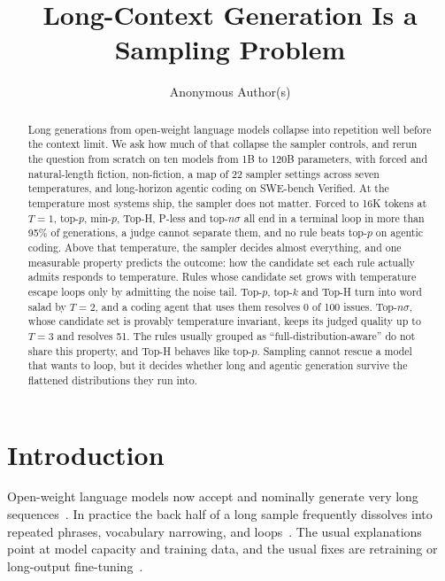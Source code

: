 \documentclass{article}
\title{Long-Context Generation Is a Sampling Problem}
\author{
  Anonymous Author(s)
}
\begin{document}
\maketitle


\begin{abstract}
Long generations from open-weight language models collapse into repetition well before the context limit. We ask how much of that collapse the sampler controls, and rerun the question from scratch on ten models from 1B to 120B parameters, with forced and natural-length fiction, non-fiction, a map of 22 sampler settings across seven temperatures, and long-horizon agentic coding on SWE-bench Verified. At the temperature most systems ship, the sampler does not matter. Forced to 16K tokens at $T{=}1$, top-$p$, min-$p$, Top-H, P-less and top-$n\sigma$ all end in a terminal loop in more than 95\% of generations, a judge cannot separate them, and no rule beats top-$p$ on agentic coding. Above that temperature, the sampler decides almost everything, and one measurable property predicts the outcome: how the candidate set each rule actually admits responds to temperature. Rules whose candidate set grows with temperature escape loops only by admitting the noise tail. Top-$p$, top-$k$ and Top-H turn into word salad by $T{=}2$, and a coding agent that uses them resolves 0 of 100 issues. Top-$n\sigma$, whose candidate set is provably temperature invariant, keeps its judged quality up to $T{=}3$ and resolves 51. The rules usually grouped as ``full-distribution-aware'' do not share this property, and Top-H behaves like top-$p$. Sampling cannot rescue a model that wants to loop, but it decides whether long and agentic generation survive the flattened distributions they run into.
\end{abstract}

\section{Introduction}

Open-weight language models now accept and nominally generate very long sequences~\citep{dubey2024llama3,yang2024qwen2}. In practice the back half of a long sample frequently dissolves into repeated phrases, vocabulary narrowing, and loops~\citep{holtzman2020curious,welleck2020neural,fu2021theoretical}. The usual explanations point at model capacity and training data, and the usual fixes are retraining or long-output fine-tuning~\citep{bai2025longwriter}.
\end{document}
